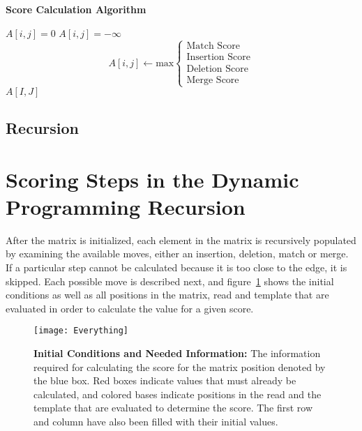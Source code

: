 \documentclass[paper=a4, fontsize=11pt]{scrartcl}
\numberwithin{equation}{section}		%
\numberwithin{figure}{section}			%
\numberwithin{table}{section}				%
\begin{document}
\begin{algorithm}
\caption*{\textbf{Score Calculation Algorithm}}
\label{calcScore}
\begin{algorithmic}[h]
\STATE $A[i,j] = 0$
\STATE $A[i,j] = -\infty $
\ELSE
\STATE \[
	A[i,j]  \leftarrow \text{max}
\begin{cases}
\text{Match Score} \\
\text{Insertion Score} \\
	\text{Deletion Score} \\
   		\text{Merge Score} \end{cases}
\]
\ENDIF	
\ENDFOR
\ENDFOR
\RETURN $A[I,J]$
\end{algorithmic}
\end{algorithm}


\subsection*{Recursion}



\section{Scoring Steps in the Dynamic Programming Recursion}
After the matrix is initialized, each element in the matrix is recursively populated by examining the available moves, either an insertion, deletion, match or merge.  If a particular step cannot be calculated because it is too close to the edge, it is skipped.  Each possible move is described next, and figure~\ref{fig:everything} shows the initial conditions as well as all positions in the matrix, read and template that are evaluated in order to calculate the value for a given score.


\begin{figure}[H] %
	\texttt{[image: Everything]}
		\caption{\textbf{Initial Conditions and Needed Information:} The information required for calculating the score for the matrix position denoted by the blue box.  Red boxes indicate values that must already be calculated, and colored bases indicate positions in the read and the template that are evaluated to determine the score.  The first row and column have also been filled with their initial values.}		
		\label{fig:everything}		
\end{figure}
\end{document}
